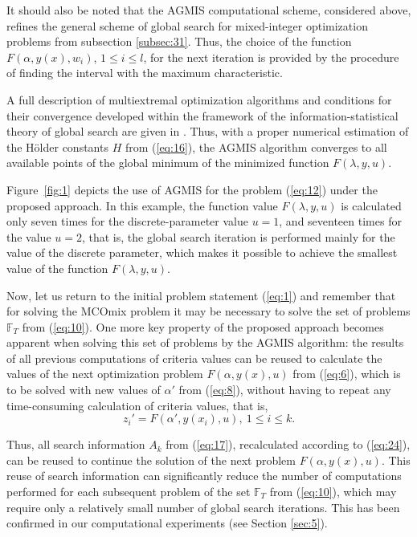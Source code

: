 \documentclass{svproc}
\begin{document}
It should also be noted that the AGMIS computational scheme, considered above, refines the general scheme of global search for mixed-integer optimization problems from subsection \ref{subsec:31}. Thus, the choice of the function $F(\alpha, y(x), w_i)$, $1\leq i\leq l$, for the next iteration is provided by the procedure of finding the interval with the maximum characteristic.

A full description of multiextremal optimization algorithms and conditions for their convergence developed within the framework of the information-statistical theory of global search are given in \cite{c24}. Thus, with a proper numerical estimation of the H{\"o}lder constants $H$ from (\ref{eq:16}), the AGMIS algorithm converges to all available points of the global minimum of the minimized function $F(\lambda, y, u)$.

Figure~\ref{fig:1} depicts the use of AGMIS for the problem (\ref{eq:12}) under the proposed approach. In this example, the function value $F(\lambda, y, u)$ is calculated only seven times for the discrete-parameter value $u=1$, and seventeen times for the value $u=2$, that is, the global search iteration is performed mainly for the value of the discrete parameter, which makes it possible to achieve the smallest value of the function $F(\lambda, y, u)$.

Now, let us return to the initial problem statement (\ref{eq:1}) and remember that for solving the MCOmix problem it may be necessary to solve the set of problems $\mathbb{F}_T$ from (\ref{eq:10}). One more key property of the proposed approach becomes apparent when solving this set of problems by the AGMIS algorithm: the results of all previous  computations of criteria values can be reused to calculate the values of the next optimization problem $F(\alpha, y(x), u)$ from (\ref{eq:6}), which is to be solved with new values of $\alpha'$ from (\ref{eq:8}), without having to repeat any time-consuming calculation of criteria values, that is,
\begin{equation}\label{eq:24}
 z_i'=F(\alpha',y(x_i), u),\ 1 \leq i \leq k.
\end{equation}

Thus, all search information $A_k$ from (\ref{eq:17}), recalculated according to (\ref{eq:24}), can be reused to continue the solution of the next problem $F(\alpha, y(x), u)$.  This reuse of search information can significantly reduce the number of computations performed for each subsequent problem of the set $\mathbb{F}_T$ from (\ref{eq:10}), which may require only a relatively small number of global search iterations. This  has been confirmed  in our computational experiments (see Section \ref{sec:5}).
\end{document}

